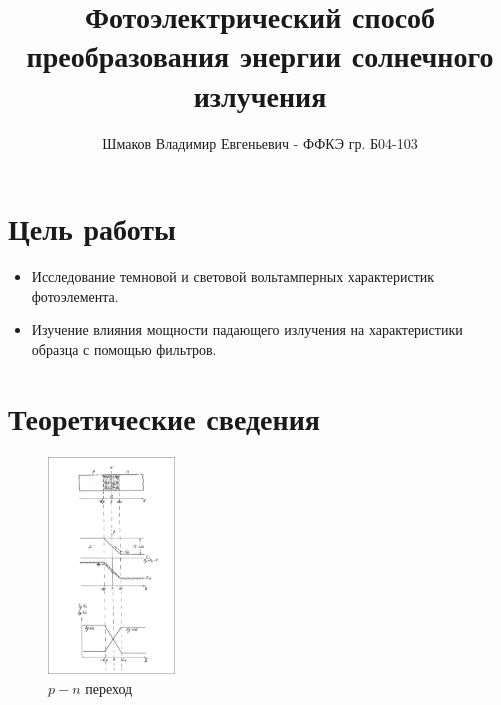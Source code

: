 \documentclass[a4paper, 12pt]{extarticle}
\title{\textcolor{main_title}{Фотоэлектрический способ преобразования энергии солнечного излучения}}
\author{Шмаков Владимир Евгеньевич - ФФКЭ гр. Б04-103}
\begin{document}
\maketitle



\section*{\textcolor{header}{Цель работы}}

\begin{itemize}
    \item Исследование темновой и световой вольтамперных характеристик фотоэлемента.
    \item Изучение влияния мощности падающего излучения на характеристики образца с помощью фильтров.
\end{itemize}

\section*{\textcolor{header}{Теоретические сведения}}



\begin{figure}[htbp]
    \centering
    \includegraphics[width = 0.3\textwidth]{pics/diode.png}
    \caption{$p-n$ переход}
    \label{fig:diode}
\end{figure}
\end{document}
